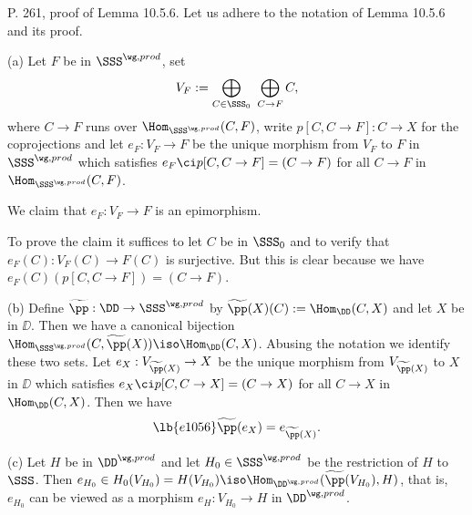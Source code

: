 \documentclass[12pt]{article}
\theoremstyle{remark}
\theoremstyle{definition}
\begin{document}
%

\begin{s}
P. 261, proof of Lemma 10.5.6. Let us adhere to the notation of Lemma 10.5.6 and its proof.

\nn(a) Let $F$ be in $\SSS^{\wg,prod}$, set 
$$
V_F:=\bigoplus_{C\in\SSS_0}\ \bigoplus_{C\to F}C,
$$ 
where $C\to F$ runs over $\Hom_{\SSS^{\wg,prod}}(C,F)$, write $p[C,C\to F]:C\to X$ for the coprojections and let $e_F:V_F\to F$ be the unique morphism from $V_F$ to $F$ in $\SSS^{\wg,prod}$ which satisfies $e_F\ci p[C,C\to F]=(C\to F)$ for all $C\to F$ in $\Hom_{\SSS^{\wg,prod}}(C,F)$. 

We claim that $e_F:V_F\to F$ is an epimorphism. 

To prove the claim it suffices to let $C$ be in $\SSS_0$ and to verify that $e_F(C):V_F(C)\to F(C)$ is surjective. But this is clear because we have $e_F(C)(p[C,C\to F])=(C\to F)$.

\nn(b) Define $\widetilde\pp:\DD\to\SSS^{\wg,prod}$ by $\widetilde\pp(X)(C):=\Hom_\DD(C,X)$ and let $X$ be in $\DD$. Then we have a canonical bijection $\Hom_{\SSS^{\wg,prod}}(C,\widetilde\pp(X))\iso\Hom_\DD(C,X)$. Abusing the notation we identify these two sets. Let $e_X:V_{\widetilde\pp(X)}\to X$ be the unique morphism from $V_{\widetilde\pp(X)}$ to $X$ in $\DD$ which satisfies $e_X\ci p[C,C\to X]=(C\to X)$ for all $C\to X$ in $\Hom_\DD(C,X)$.  Then we have 
\begin{equation}\lb{e1056}
\widetilde\pp(e_X)=e_{\widetilde\pp(X)}.
\end{equation}

\nn(c) Let $H$ be in $\DD^{\wg,prod}$ and let $H_0\in\SSS^{\wg,prod}$ be the restriction of $H$ to $\SSS$. Then $e_{H_0}\in H_0(V_{H_0})=H(V_{H_0})\iso\Hom_{\DD^{\wg,prod}}(\widetilde\pp(V_{H_0}),H)$, that is, $e_{H_0}$ can be viewed as a morphism $e_H:V_{H_0}\to H$ in $\DD^{\wg,prod}$.
\end{s}

\end{document}
